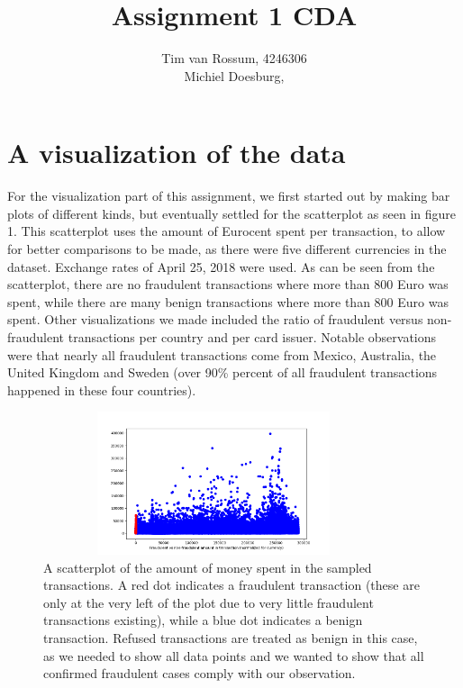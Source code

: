 \documentclass[]{article}
\title{Assignment 1 CDA}
\author{Tim van Rossum, 4246306\\
	Michiel Doesburg,}
\begin{document}
\maketitle

\section{A visualization of the data}
For the visualization part of this assignment, we first started out by making bar plots of different kinds, but eventually settled  for the scatterplot as seen in figure 1. This scatterplot uses the amount of Eurocent spent per transaction, to allow for better comparisons to be made, as there were five different currencies in the dataset. Exchange rates of April 25, 2018 were used. As can be seen from the scatterplot, there are no fraudulent transactions where more than 800 Euro was spent, while there are many benign transactions where more than 800 Euro was spent. Other visualizations we made included the ratio of fraudulent versus non-fraudulent transactions per country and per card issuer. Notable observations were that nearly all fraudulent transactions come from Mexico, Australia, the United Kingdom and Sweden (over 90\% percent of all fraudulent transactions happened in these four countries).
\begin{figure}[h!]
	\centering
	\includegraphics[width=10cm,height=4.2cm]{Visualizations/AmtFraudvsNonFraud2.png}
	\caption{A scatterplot of the amount of money spent in the sampled transactions. A red dot indicates a fraudulent transaction (these are only at the very left of the plot due to very little fraudulent transactions existing), while a blue dot indicates a benign transaction. Refused transactions are treated as benign in this case, as we needed to show all data points and we wanted to show that all confirmed fraudulent cases comply with our observation.}
\end{figure}
\clearpage
\end{document}
